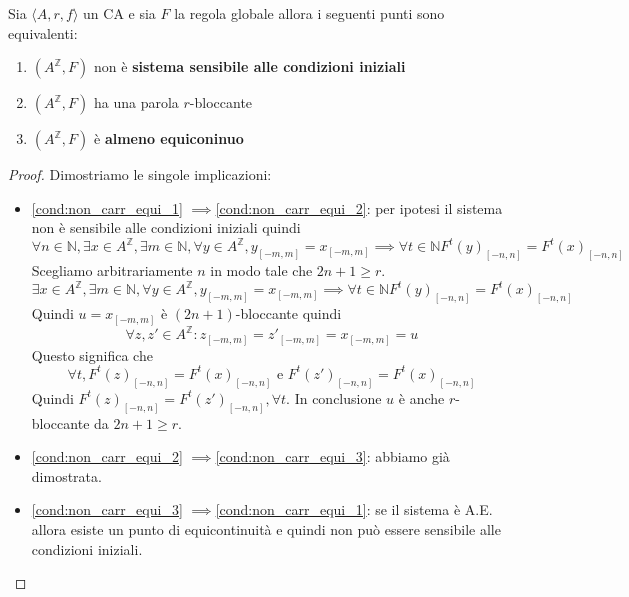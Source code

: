 \begin{teorema}
    Sia $\langle A,r,f\rangle$ un CA e sia $F$ la regola globale allora i seguenti
    punti sono equivalenti:
    \begin{enumerate}
        \item \label{cond:non_carr_a_equi_1} $(A^\mathbb{Z}, F)$ non è \textbf{sistema
                  sensibile alle condizioni iniziali}
        \item \label{cond:non_carr_a_equi_2} $(A^\mathbb{Z}, F)$ ha una parola $r$-bloccante
        \item \label{cond:non_carr_a_equi_3} $(A^\mathbb{Z}, F)$ è \textbf{almeno equiconinuo}
    \end{enumerate}
    \begin{proof}
        Dimostriamo le singole implicazioni:
        \begin{itemize}
            \item \ref{cond:non_carr_equi_1} $\implies $\ref{cond:non_carr_equi_2}:
                  per ipotesi il sistema non è sensibile alle condizioni iniziali quindi
                  $$\forall n\in \mathbb{N} ,\exists x \in A^\mathbb{Z}, \exists m\in \mathbb{N} , \forall y\in A^\mathbb{Z}, y_{[-m,m]} = x_{[-m,m]} \implies \forall t\in \mathbb{N} F^t(y)_{[-n,n]}= F^t(x)_{[-n,n]}$$
                  Scegliamo arbitrariamente $n$ in modo tale che $2n+1\ge r$.
                  $$\exists x \in A^\mathbb{Z}, \exists m\in \mathbb{N} , \forall y\in A^\mathbb{Z}, y_{[-m,m]} = x_{[-m,m]} \implies \forall t\in \mathbb{N} F^t(y)_{[-n,n]}= F^t(x)_{[-n,n]}$$
                  Quindi $u=x_{[-m,m]}$ è $(2n+1)$-bloccante quindi
                  $$\forall z,z'\in A^\mathbb{Z}: z_{[-m,m]}=z'_{[-m,m]} = x_{[-m,m]} =u$$
                  Questo significa che
                  $$\forall t, F^t(z)_{[-n,n]} = F^t(x)_{[-n,n]}\text{ e } F^t(z')_{[-n,n]} = F^t(x)_{[-n,n]}$$
                  Quindi $F^t(z)_{[-n,n]} = F^t(z')_{[-n,n]},\forall t$. In conclusione $u$
                  è anche $r$-bloccante da $2n+1\ge r$.
            \item \ref{cond:non_carr_equi_2} $\implies $\ref{cond:non_carr_equi_3}:
                  abbiamo già dimostrata.
            \item \ref{cond:non_carr_equi_3} $\implies $\ref{cond:non_carr_equi_1}:
                  se il sistema è A.E. allora esiste un punto di equicontinuità e quindi
                  non può essere sensibile alle condizioni iniziali.
        \end{itemize}
    \end{proof}
\end{teorema}

